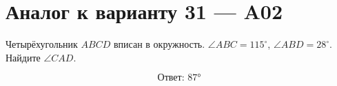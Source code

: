 


\section*{Аналог к варианту 31 — A02}
Четырёхугольник \(ABCD\) вписан в окружность. \(\angle ABC=115^\circ\), \(\angle ABD=28^\circ\). Найдите \(\angle CAD\).
\begin{center}\figCyclicChord\end{center}
\[\boxed{\text{Ответ: }87°}\]

